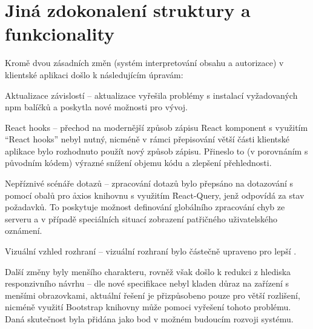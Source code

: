 \section{Jiná zdokonalení struktury a funkcionality}\label{sec:client-improve}

Kromě dvou zásadních změn (systém interpretování obsahu a autorizace) v klientské aplikaci došlo k následujícím úpravám:

\begin{dl}
   \item[Aktualizace závislostí] – aktualizace vyřešila problémy s instalací vyžadovaných npm balíčků a poskytla nové možnosti pro vývoj.

   \item[React hooks] – přechod na modernější způsob zápisu React komponent s využitím \enquote{React hooks} nebyl nutný, nicméně v rámci přepisování větší části klientské aplikace bylo rozhodnuto použít nový způsob zápisu.
   Přineslo to (v porovnáním s původním kódem) výrazné snížení objemu kódu a zlepšení přehlednosti.

   \item[Nepříznivé scénáře \g{API} dotazů] – zpracování  dotazů bylo přepsáno na dotazování s pomocí obalů pro \h{axios} knihovnu s využitím \h{React-Query}, jenž odpovídá za stav požadavků.
   To poskytuje možnost definování globálního zpracování chyb ze serveru a v případě speciálních situací zobrazení patřičného uživatelského oznámení.

   \item[Vizuální vzhled rozhraní] – vizuální rozhraní bylo částečně upraveno pro lepší .
\end{dl}

Další změny byly menšího charakteru, rovněž však došlo k redukci z hlediska responzivního návrhu – dle nové specifikace nebyl kladen důraz na zařízení s menšími obrazovkami, aktuální řešení je přizpůsobeno pouze pro větší rozlišení, nicméně využití Bootstrap knihovny může pomoci vyřešení tohoto problému.
Daná skutečnost byla přidána jako bod v možném budoucím rozvoji systému.
